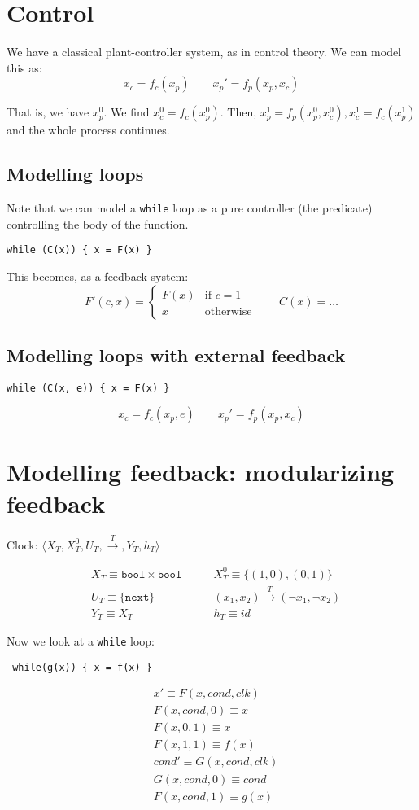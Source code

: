 \documentclass[11pt]{book}
\newcommand{\bool}{\ensuremath{\texttt{bool}}}
\begin{document}
\chapter{Control}

We have a classical plant-controller system, as in control theory. We can
model this as:
$$ x_c = f_c(x_p) \qquad x_p' = f_p(x_p, x_c) $$

That is, we have $x_p^0$. We find $x_c^0 = f_c(x_p^0)$. Then, 
$x_p^1 = f_p(x_p^0, x_c^0),x_c^1 = f_c(x_p^1)$ and the whole process continues.

\section{Modelling loops} 
Note that we can model a \texttt{while} loop as a pure controller (the predicate)
controlling the body of the function.  
\begin{verbatim}
while (C(x)) { x = F(x) }
\end{verbatim}
This becomes, as a feedback system:
$$
F'(c, x) = \begin{cases} F(x) & \text{if $c = 1$} \\ x & \text{otherwise} \end{cases}
\qquad
C(x) = \dots
$$

\section{Modelling loops with external feedback} 
\begin{verbatim}
while (C(x, e)) { x = F(x) }
\end{verbatim}
$$ x_c = f_c(x_p, e) \qquad x_p' = f_p(x_p, x_c) $$

\chapter{Modelling feedback: modularizing feedback}

Clock: $\langle X_T, X^0_T, U_T, \xrightarrow{T}, Y_T, h_T \rangle$

\begin{align*}
    &X_T \equiv \bool \times \bool \qquad &X^0_T \equiv \{ (1, 0), (0, 1) \} \\
    &U_T \equiv \{ \texttt{next} \} \qquad &(x_1, x_2) \xrightarrow{T} (\lnot x_1, \lnot x_2) \\
    &Y_T \equiv X_T \qquad &h_T \equiv id
\end{align*}

Now we look at a \texttt{while} loop: \begin{verbatim} while(g(x)) { x = f(x) } \end{verbatim}
\begin{align*}
    &x' \equiv F(x, cond, clk) \\
    &F(x, cond, 0) \equiv x \\
    &F(x, 0, 1) \equiv x \\
    &F(x, 1, 1) \equiv f(x) \\
    &cond' \equiv G(x, cond, clk) \\
    &G(x, cond, 0) \equiv cond \\
    &F(x, cond, 1) \equiv g(x)
\end{align*}
\end{document}

